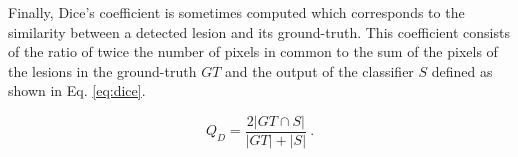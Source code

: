 Finally, Dice's coefficient is sometimes computed which corresponds to the similarity between a detected lesion and its ground-truth. This coefficient consists of the ratio of twice the number of pixels in common to the sum of the pixels of the lesions in the ground-truth $GT$ and the output of the classifier $S$ defined as shown in Eq. \eqref{eq:dice}.

\begin{equation}
	Q_D = \frac{2 | GT \cap S |}{| GT | + | S |} \ .
	\label{eq:dice}
\end{equation}